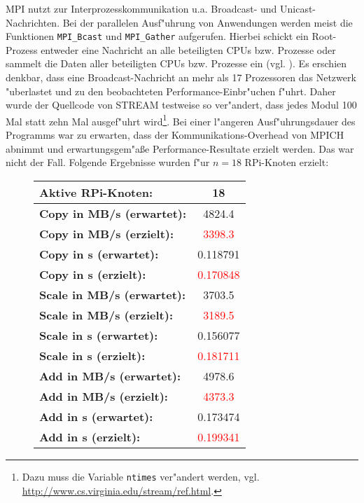 \begin{enumerate}
MPI nutzt zur Interprozesskommunikation u.a. Broadcast- und Unicast-Nachrichten. Bei der parallelen Ausf"uhrung von Anwendungen werden meist die Funktionen \texttt{MPI\_Bcast} und \texttt{MPI\_Gather} aufgerufen. Hierbei schickt ein Root-Prozess entweder eine Nachricht an alle beteiligten CPUs bzw. Prozesse oder sammelt die Daten aller beteiligten CPUs bzw. Prozesse ein (vgl. \cite{pie12}). Es erschien denkbar, dass eine Broadcast-Nachricht an mehr als 17 Prozessoren das Netzwerk "uberlastet und zu den beobachteten Performance-Einbr"uchen f"uhrt. Daher wurde der Quellcode von STREAM testweise so ver"andert, dass jedes Modul 100 Mal statt zehn Mal ausgef"uhrt wird\footnote{Dazu muss die Variable \texttt{ntimes} ver"andert werden, vgl. \url{http://www.cs.virginia.edu/stream/ref.html}.}. Bei einer l"angeren Ausf"uhrungsdauer des Programms war zu erwarten, dass der Kommunikations-Overhead von MPICH abnimmt und erwartungsgem"a\ss e Performance-Resultate erzielt werden. Das war nicht der Fall. Folgende Ergebnisse wurden f"ur $n=18$ RPi-Knoten erzielt: 
\begin{figure}
  \centering
  \begin{tabular}{|l|c|}
    \hline 
    \textbf{Aktive RPi-Knoten:} & \textbf{18}\\ 
    \hline 
    \textbf{Copy in MB/s (erwartet):} & 4824.4\\
    \hline 
    \textbf{Copy in MB/s (erzielt):} & \textcolor{red}{3398.3}\\
    \hline 
    \textbf{Copy in s (erwartet):} & 0.118791\\
    \hline 
    \textbf{Copy in s (erzielt):} & \textcolor{red}{0.170848}\\
    \hline 
    \textbf{Scale in MB/s (erwartet):} & 3703.5\\
    \hline 
    \textbf{Scale in MB/s (erzielt):} & \textcolor{red}{3189.5}\\
    \hline 
	\textbf{Scale in s (erwartet):} & 0.156077\\
    \hline 
    \textbf{Scale in s (erzielt):} & \textcolor{red}{0.181711}\\
    \hline 
    \textbf{Add in MB/s (erwartet):} & 4978.6\\
    \hline 
    \textbf{Add in MB/s (erzielt):}& \textcolor{red}{4373.3}\\
    \hline 
    \textbf{Add in s (erwartet):} & 0.173474\\
    \hline 
    \textbf{Add in s (erzielt):} & \textcolor{red}{0.199341}\\
    \hline 

\end{tabular}
\end{figure}
\end{enumerate}
